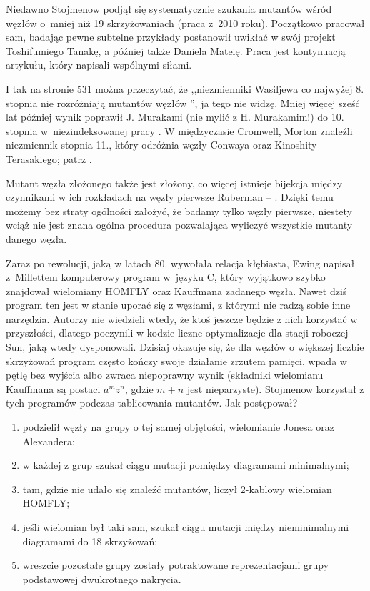 Niedawno Stojmenow podjął się systematycznie szukania mutantów wśród węzłów o~mniej niż 19 skrzyżowaniach (praca \cite{stoimenow10} z~2010 roku).
%
Początkowo pracował sam, badając pewne subtelne przykłady postanowił uwikłać w swój projekt Toshifumiego Tanakę, a później także Daniela Mateię.
%
%
Praca \cite{stoimenow10} jest kontynuacją artykułu, który napisali wspólnymi siłami.

I tak na stronie 531 można przeczytać, że ,,niezmienniki Wasiljewa co najwyżej 8. stopnia nie rozróżniają mutantów węzłów \cite{chmutov94}'', ja tego nie widzę.
%
Mniej więcej sześć lat później wynik poprawił J. Murakami (nie mylić z H. Murakamim!) do 10. stopnia w~niezindeksowanej pracy \cite{murakami99}.
W międzyczasie Cromwell, Morton znaleźli niezmiennik stopnia 11., który odróżnia węzły Conwaya oraz Kinoshity-Terasakiego; patrz \cite{cromwell96}.
%
%

Mutant węzła złożonego także jest złożony, co więcej istnieje bijekcja między czynnikami w ich rozkładach na węzły pierwsze Ruberman -- \cite{ruberman87}.
%
Dzięki temu możemy bez straty ogólności założyć, że badamy tylko węzły pierwsze, niestety wciąż nie jest znana ogólna procedura pozwalająca wyliczyć wszystkie mutanty danego węzła.

Zaraz po rewolucji, jaką w latach 80. wywołała relacja kłębiasta, Ewing napisał z~Millettem komputerowy program w~języku C, który wyjątkowo szybko znajdował wielomiany HOMFLY oraz Kauffmana zadanego węzła.
%
%
Nawet dziś program ten jest w stanie uporać się z węzłami, z którymi nie radzą sobie inne narzędzia.
Autorzy nie wiedzieli wtedy, że ktoś jeszcze będzie z nich korzystać w przyszłości, dlatego poczynili w kodzie liczne optymalizacje dla stacji roboczej Sun, jaką wtedy dysponowali.
Dzisiaj okazuje się, że dla węzłów o większej liczbie skrzyżowań program często kończy swoje działanie zrzutem pamięci, wpada w pętlę bez wyjścia albo zwraca niepoprawny wynik (składniki wielomianu Kauffmana są postaci $a^m z^n$, gdzie $m + n$ jest nieparzyste).
Stojmenow korzystał z tych programów podczas tablicowania mutantów.
Jak postępował?
\begin{enumerate}
    \item podzielił węzły na grupy o tej samej objętości, wielomianie Jonesa oraz Alexandera;
    \item w każdej z grup szukał ciągu mutacji pomiędzy diagramami minimalnymi;
    \item tam, gdzie nie udało się znaleźć mutantów, liczył 2-kablowy wielomian HOMFLY;
    \item jeśli wielomian był taki sam, szukał ciągu mutacji między nieminimalnymi diagramami do 18 skrzyżowań;
    \item wreszcie pozostałe grupy zostały potraktowane reprezentacjami grupy podstawowej dwukrotnego nakrycia.
\end{enumerate}

